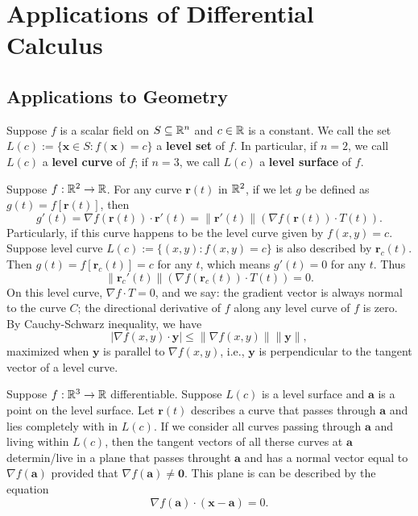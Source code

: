     \chapter{Applications of Differential Calculus}
    \section{Applications to Geometry}
    \begin{definitionenv}
        Suppose $f$ is a scalar field on $S\subseteq \mathbb{R}^n$ and $c\in \mathbb{R}$ is a constant. We call the set $L(c) := \{\bm x \in S: f(\bm x) = c\}$ a \textbf{level set} of $f$. In particular, if $n=2$, we call $L(c)$ a \textbf{level curve} of $f$; if $n=3$, we call $L(c)$ a \textbf{level surface} of $f$.
    \end{definitionenv}
    \begin{exampleenv}
        Suppose $f:\mathbb{R}^2 \to \mathbb{R}$. For any curve $\bm r(t) $ in $\mathbb{R}^2$, if we let $g$ be defined as $g(t) = f[\bm r(t)]$, then $$g'(t) = \nabla f(\bm r(t)) \cdot \bm r'(t) = \| \bm r'(t)\| \left( \nabla f(\bm r(t)) \cdot T(t) \right).$$
        Particularly, if this curve happens to be the level curve given by $f(x,y)  = c$. Suppose level curve $L(c) := \{ (x,y) : f(x,y) = c\}$ is also described by $\bm r_c(t)$. Then $g(t) = f[\bm r_c(t)] = c$ for any $t$, which means $g'(t) = 0$ for any $t$. Thus
        $$
        \| \bm r_c'(t)\| \left( \nabla f(\bm r_c(t)) \cdot T(t) \right) = 0.
        $$
        On this level curve, $\nabla f \cdot T = 0$, and we say: the gradient vector is always normal to the curve $C$; the directional derivative of $f$ along any level curve of $f$ is zero. By Cauchy-Schwarz inequality, we have
        $$ |\nabla f(x,y) \cdot \bm y | \le \|\nabla f(x,y)\| \|\bm y\|, $$
        maximized when $\bm y$ is parallel to $\nabla f(x,y)$, i.e., $\bm y$ is perpendicular to the tangent vector of a level curve.
    \end{exampleenv}
    \begin{exampleenv}
        Suppose $f:\mathbb{R}^3 \to \mathbb{R}$ differentiable. Suppose $L(c)$ is a level surface and $\bm a$ is a point on the level surface. Let $\bm r (t)$ describes a curve that passes through $\bm a$ and lies completely with in $L(c)$. If we consider all curves passing through $\bm a $ and living within $L(c)$, then the tangent vectors of all therse curves at $\bm a$ determin/live in a plane that passes throught $\bm a$ and has a normal vector equal to $\nabla f(\bm a)$ provided that $\nabla f(\bm a) \ne \bm 0$. This plane is can be described by the equation
        $$ \nabla f(\bm a) \cdot (\bm x - \bm a) = 0. $$
    \end{exampleenv}

